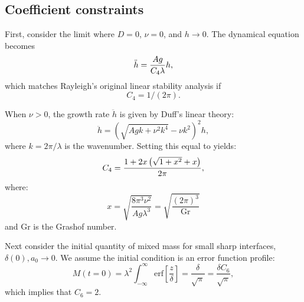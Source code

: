 \subsection{Coefficient constraints}
First, consider the limit where $D = 0$, $\nu = 0$, and $h \rightarrow 0$.
The dynamical equation becomes
\begin{equation} \elabel{first_constraint}
\ddot{h} = \frac{A g }{C_4 \lambda} h,
\end{equation}
which matches Rayleigh's original linear stability analysis if 
\begin{equation} 
C_4 = 1/(2 \pi).
\end{equation}

When $\nu > 0$, the growth rate $\ddot{h}$ is given by Duff's linear theory:
\begin{equation}
\ddot{h} = \left(\sqrt{A g k + \nu^2 k^4} - \nu k^2\right)^2 h,
\end{equation}
where $k = 2\pi / \lambda$ is the wavenumber.
Setting this equal to  yields:
\begin{equation} \elabel{c4}
C_4 = \frac{1 + 2x\left(\sqrt{1 + x^2} + x\right)}{2\pi},
\end{equation}
where:
\begin{equation}
x = \sqrt{\frac{8 \pi^3 \nu^2}{A g \lambda^3}} = \sqrt{\frac{(2 \pi)^3}{\text{Gr}}}
\end{equation}
and Gr is the Grashof number.

Next consider the initial quantity of mixed mass for small sharp interfaces, $\delta(0), a_0 \rightarrow 0$.
We assume the initial condition is an error function profile:
\begin{equation}
M(t=0) = \lambda^2 \int_{-\infty}^{\infty} \text{erf}\left[\frac{z}{\delta}\right] = \frac{\delta}{\sqrt{\pi}} = \frac{\delta C_6}{\sqrt{\pi}},
\end{equation}
which implies that $C_6 = 2$.

